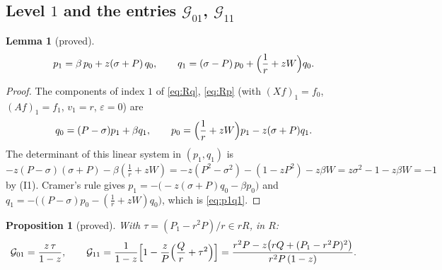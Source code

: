 \documentclass[11pt]{article}
\newtheorem{proposition}[theorem]{Proposition}
\newtheorem{lemma}[theorem]{Lemma}
\theoremstyle{definition}
\theoremstyle{remark}
\begin{document}
\subsection{Level $1$ and the entries $\mathcal G_{01}$, $\mathcal G_{11}$}

\begin{lemma}[proved]\label{lem:level1}
\begin{equation}\label{eq:p1q1}
p_1=\beta\,p_0+z(\sigma+P)\,q_0,\qquad q_1=(\sigma-P)\,p_0+\Bigl(\frac1r+zW\Bigr)q_0 .
\end{equation}
\end{lemma}

\begin{proof}
The components of index $1$ of \eqref{eq:Rq}, \eqref{eq:Rp} (with $(Xf)_1=f_0$, $(Af)_1=f_1$, $v_1=r$, $\varepsilon=0$) are
\[
q_0=(P-\sigma)p_1+\beta q_1,\qquad p_0=\Bigl(\frac1r+zW\Bigr)p_1-z(\sigma+P)q_1 .
\]
The determinant of this linear system in $(p_1,q_1)$ is $-z(P-\sigma)(\sigma+P)-\beta(\frac1r+zW)=-z(P^2-\sigma^2)-(1-zP^2)-z\beta W=z\sigma^2-1-z\beta W=-1$ by (I1). Cramer's rule gives $p_1=-\bigl(-z(\sigma+P)q_0-\beta p_0\bigr)$ and $q_1=-\bigl((P-\sigma)p_0-(\frac1r+zW)q_0\bigr)$, which is \eqref{eq:p1q1}.
\end{proof}

\begin{proposition}[proved]\label{prop:level1}
With $\tau=(P_1-r^2P)/r\in rR$, in $R$:
\begin{equation}\label{eq:G01G11}
\mathcal G_{01}=\frac{z\,\tau}{1-z},\qquad
\mathcal G_{11}=\frac1{1-z}\Bigl[1-\frac zP\Bigl(\frac Qr+\tau^2\Bigr)\Bigr]
=\frac{r^2P-z\bigl(rQ+(P_1-r^2P)^2\bigr)}{r^2P\,(1-z)} .
\end{equation}
\end{proposition}
\end{document}
